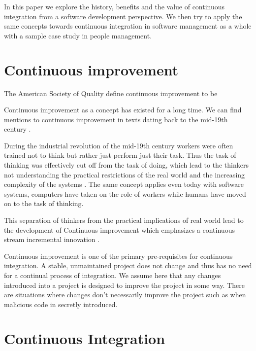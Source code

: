 \documentclass[12pt,conference]{IEEEtran}
\begin{document}
In this paper we explore the history, benefits and the value of continuous integration from a software development perspective. We then try to apply the same concepts towards continuous integration in software management as a whole with a sample case study in people management. 


\section*{Continuous improvement}

The American Society of Quality define continuous improvement to be 
 \cite{american_society_for_quality_continuous_????}

Continuous improvement as a concept has existed for a long time. We can find mentions to continuous improvement in texts dating back to the mid-19th century \cite{schroeder_americas_????}. 

During the industrial revolution of the mid-19th century workers were often trained not to think but rather just perform just their task. Thus the task of thinking was effectively cut off from the task of doing, which lead to the thinkers not understanding the practical restrictions of the real world and the increasing complexity of the systems \cite{schroeder_americas_????}. The same concept applies even today with software systems, computers have taken on the role of workers while humans have moved on to the task of thinking.

This separation of thinkers from the practical implications of real world lead to the development of Continuous improvement which emphasizes a continuous stream incremental innovation \cite{bessant_rediscovering_1994}.

Continuous improvement is one of the primary pre-requisites for continuous integration. A stable, unmaintained project does not change and thus has no need for a continual process of integration. We assume here that any changes introduced into a project is designed to improve the project in some way. There are situations where changes don't necessarily improve the project such as when malicious code in secretly introduced. 


\section*{Continuous Integration}
\end{document}
